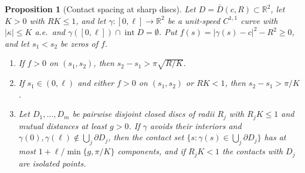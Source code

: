 \documentclass[11pt,reqno]{amsart}
\newtheorem{proposition}[theorem]{Proposition}
\theoremstyle{definition}
\providecommand{\R}{\mathbb{R}}
\numberwithin{equation}{section}
\providecommand{\R}{\mathbb{R}}
\begin{document}
\begin{proposition}[Contact spacing at sharp discs]
\label{prop:sharp_disc_spacing}
Let $D = \bar D(c, R) \subset \R^2$, let $K > 0$ with $RK \le 1$, and let $\gamma\colon[0,\ell] \to \R^2$ be a unit-speed $C^{1,1}$ curve with $|\kappa| \le K$ a.e.\ and $\gamma([0,\ell]) \cap \operatorname{int} D = \emptyset$. Put $f(s) = |\gamma(s) - c|^2 - R^2 \ge 0$, and let $s_1 < s_2$ be zeros of $f$.
\begin{enumerate}
    \item If $f > 0$ on $(s_1, s_2)$, then $s_2 - s_1 > \pi\sqrt{R/K}$.
    \item If $s_1 \in (0, \ell)$ and either $f > 0$ on $(s_1, s_2)$ or $RK < 1$, then $s_2 - s_1 > \pi/K$.
    \item Let $D_1, \dots, D_m$ be pairwise disjoint closed discs of radii $R_j$ with $R_j K \le 1$ and mutual distances at least $g > 0$. If $\gamma$ avoids their interiors and $\gamma(0), \gamma(\ell) \notin \bigcup_j \partial D_j$, then the contact set $\{s : \gamma(s) \in \bigcup_j \partial D_j\}$ has at most $1 + \ell/\min\{g, \pi/K\}$ components, and if $R_j K < 1$ the contacts with $D_j$ are isolated points.
\end{enumerate}
\end{proposition}
\end{document}
